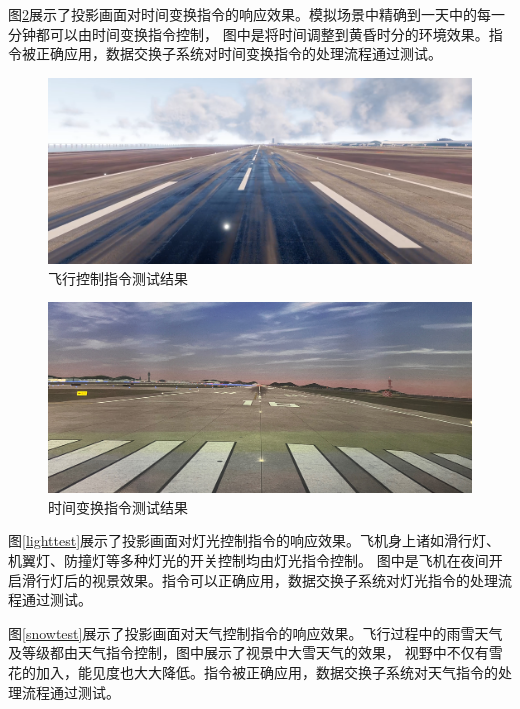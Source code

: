 \par
图\ref{todtest}展示了投影画面对时间变换指令的响应效果。模拟场景中精确到一天中的每一分钟都可以由时间变换指令控制，
图中是将时间调整到黄昏时分的环境效果。指令被正确应用，数据交换子系统对时间变换指令的处理流程通过测试。
\clearpage
\begin{figure}[h!]
    \begin{center}
        \includegraphics[width=.9\textwidth]{pictures/firstcamera.png}
        \caption{飞行控制指令测试结果}
        \label{21test}
    \end{center}
\end{figure}
\begin{figure}[h!]
    \begin{center}
        \includegraphics[width=.9\textwidth]{pictures/todtest.jpg}
        \caption{时间变换指令测试结果}
        \label{todtest}
    \end{center}
\end{figure}
\par
图\ref{lighttest}展示了投影画面对灯光控制指令的响应效果。飞机身上诸如滑行灯、机翼灯、防撞灯等多种灯光的开关控制均由灯光指令控制。
图中是飞机在夜间开启滑行灯后的视景效果。指令可以正确应用，数据交换子系统对灯光指令的处理流程通过测试。
\par
图\ref{snowtest}展示了投影画面对天气控制指令的响应效果。飞行过程中的雨雪天气及等级都由天气指令控制，图中展示了视景中大雪天气的效果，
视野中不仅有雪花的加入，能见度也大大降低。指令被正确应用，数据交换子系统对天气指令的处理流程通过测试。
